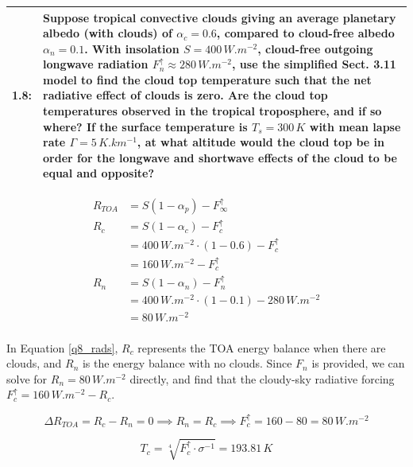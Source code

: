 \documentclass[12pt]{article}
\newcommand*{\problem}[2]{
    \begin{table}[ht]
    \centering
        \begin{tabular}{ | p{.1\linewidth} p{.9\linewidth} | }
            \hline
            \vspace{.3em}\textbf{\large#1:} & \vspace{.3em}\small{#2}\hspace{.2em}\vspace{.5em} \\ \hline
        \end{tabular}
    \end{table}
}
\begin{document}
\clearpage

\problem{1.8}{
    Suppose tropical convective clouds giving an average planetary albedo (with clouds) of $\alpha_c = 0.6$, compared to cloud-free albedo $\alpha_n = 0.1$.
    With insolation $S = 400\,\si{W.m^{-2}}$, cloud-free outgoing longwave radiation $F_n^\uparrow \approx 280\,\si{W.m^{-2}}$,
    use the simplified Sect. 3.11 model to find the cloud top temperature such that the net radiative effect of clouds is zero.
    Are the cloud top temperatures observed in the tropical troposphere, and if so where?
    If the surface temperature is $T_s = 300\,\si{K}$ with mean lapse rate $\Gamma = 5\,\si{K.km^{-1}}$, at what altitude would the cloud top be in order for the
    longwave and shortwave effects of the cloud to be equal and opposite?
}

\begin{equation}\label{q8_rads}
    \begin{split}
        R_{TOA} &= S(1-\alpha_p) - F_{\infty}^\uparrow \\
        R_c &= S (1-\alpha_c) - F_c^\uparrow \\
        &= 400\,\si{W.m^{-2}} \cdot (1-0.6) - F_c^\uparrow \\
        &=160\,\si{W.m^{-2}} - F_c^\uparrow \\
        R_n &= S (1-\alpha_n) - F_n^\uparrow \\
        &= 400\,\si{W.m^{-2}} \cdot (1-0.1) - 280\,\si{W.m^{-2}} \\
        &=80\,\si{W.m^{-2}} \\
    \end{split}
\end{equation}

In Equation \ref{q8_rads}, $R_c$ represents the TOA energy balance when there are clouds, and $R_n$ is the energy balance with no clouds.
Since $F_n$ is provided, we can solve for $R_n = 80\,\si{W.m^{-2}}$ directly, and find that the cloudy-sky radiative forcing $F_c^\uparrow = 160\,\si{W.m^{-2}}-R_c$.

\begin{equation}\label{q8_balance}
    \Delta R_{TOA} = R_c - R_n = 0 \implies R_n = R_c \implies F_c^\uparrow = 160-80 = 80\,\si{W.m^{-2}}
\end{equation}

\begin{equation}\label{q8_temp}
    T_c = \sqrt[4]{F_c^\uparrow \cdot \sigma^{-1}} = 193.81\,\si{K}
\end{equation}
\end{document}
